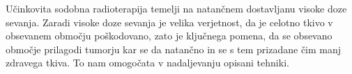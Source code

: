\documentclass[journal]{IEEEtran}
\begin{document}
\begin{comment}
Celice so zmožne popraviti manjše poškodbe DNK. \emph{Radioterapija po delih} izkorišča razliko v radiobiološki lastnosti normalnih in rakavih celic: normalne celice se v primerjavi z rakavimi celicami razmnožujejo počasneje, zato imajo več časa, da popravijo poškodbe DNK. Tovrstna radioterapija se izvaja periodično z vmesnimi odmori, ko imajo normalne celice čas, da obnovijo poškodovane DNK. Dnevne doze sevanja pri tovrstni radioterapiji so majhne, od 1.5 do 3 Gy, s čimer se v veliki meri izogne povzročitvi nepopravljive škode na normalnih celicah, je pa zato potrebno obsevanja ponavljati skoraj vsak dan v obdobju nekaj tednov, da se zadane celično smrt rakavim celicam.

Alternativa radioterapiji po delih je \emph{stereotaktična radioterapija}, kjer se dostavlja visoke doze sevanja v zgolj nekaj terapijah. Zaradi visoke doze sevanja je velika verjetnost, da bo celotno tkivo v obsevanem obmčju poškodovano, zato je ključnega pomena, da se obsevano območje prilagodi tumorju kar se da natančno. To nam omogočata \emph{intenzitetno modulirana radioterapija} (IMRT).

katere cilj je natančno dostaviti zelo visoko dozo sevanja v dobro definirano območje tumorja v zgolj nekaj terapijah. Zaradi visoke doze sevanja je zelo verjetno poškodovano celotno tkivo v ciljnem območju. Ker želimo prizadeti čim manj zdravega tkiva v neposredni okolici tumorja, hkrati pa uničiti celotno ... Za dobro prilagoditev obsevalnega območja tumorju se uporabljata tehniki \emph{moduliranja intenzitete} ter \emph{slikovno vodena radioterapija}. Intenzitetno modulirana radioterapija uporablja naprave, imenovane \emph{kolimatorji}
\end{comment}

Učinkovita sodobna radioterapija temelji na natančnem dostavljanu visoke doze sevanja. Zaradi visoke doze sevanja je velika verjetnost, da je celotno tkivo v obsevanem območju poškodovano, zato je ključnega pomena, da se obsevano območje prilagodi tumorju kar se da natančno in se s tem prizadane čim manj zdravega tkiva. To nam omogočata v nadaljevanju opisani tehniki.
\end{document}
